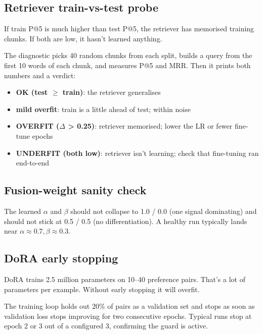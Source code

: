 \documentclass[11pt,a4paper]{article}
\begin{document}
\subsection{Retriever train-vs-test probe}

\begin{keyidea}
If train P@5 is much higher than test P@5, the retriever has memorised training chunks. If both are low, it hasn't learned anything.
\end{keyidea}

The diagnostic picks 40 random chunks from each split, builds a query from the first 10 words of each chunk, and measures P@5 and MRR. Then it prints both numbers and a verdict:

\begin{itemize}[leftmargin=*, itemsep=1pt]
\item \textbf{OK (test $\geq$ train)}: the retriever generalises
\item \textbf{mild overfit}: train is a little ahead of test; within noise
\item \textbf{OVERFIT ($\Delta$ > 0.25)}: retriever memorised; lower the LR or fewer fine-tune epochs
\item \textbf{UNDERFIT (both low)}: retriever isn't learning; check that fine-tuning ran end-to-end
\end{itemize}

\subsection{Fusion-weight sanity check}

The learned $\alpha$ and $\beta$ should not collapse to 1.0 / 0.0 (one signal dominating) and should not stick at 0.5 / 0.5 (no differentiation). A healthy run typically lands near $\alpha \approx 0.7, \beta \approx 0.3$.

\subsection{DoRA early stopping}

\begin{keyidea}
DoRA trains 2.5 million parameters on 10--40 preference pairs. That's a lot of parameters per example. Without early stopping it will overfit.
\end{keyidea}

The training loop holds out 20\% of pairs as a validation set and stops as soon as validation loss stops improving for two consecutive epochs. Typical runs stop at epoch 2 or 3 out of a configured 3, confirming the guard is active.
\end{document}
